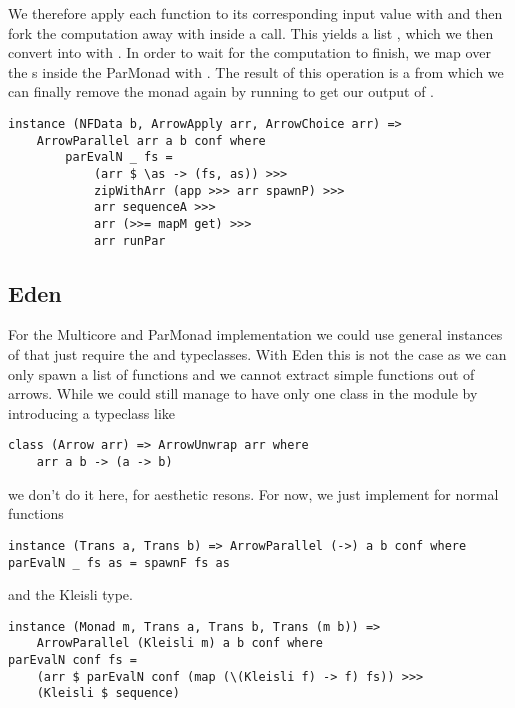 We therefore apply each function to its corresponding input value with  and then fork the computation away with  inside a  call. This yields a list , which we then convert into  with . In order to wait for the computation to finish, we map over the s inside the ParMonad with . The result of this operation is a  from which we can finally remove the monad again by running  to get our output of \code{[b]}.
\begin{lstlisting}[frame=htrbl]
instance (NFData b, ArrowApply arr, ArrowChoice arr) =>
	ArrowParallel arr a b conf where
		parEvalN _ fs = 
			(arr $ \as -> (fs, as)) >>>
			zipWithArr (app >>> arr spawnP) >>>
			arr sequenceA >>>
			arr (>>= mapM get) >>>
			arr runPar
\end{lstlisting} %

\subsection{Eden}
For the Multicore and ParMonad implementation we could use general instances of  that just require the  and  typeclasses. With Eden this is not the case as we can only spawn a list of functions and we cannot extract simple functions out of arrows. While we could still manage to have only one class in the module by introducing a typeclass like
\begin{lstlisting}[frame=htrbl]
class (Arrow arr) => ArrowUnwrap arr where
	arr a b -> (a -> b)
\end{lstlisting} %
we don't do it here, for aesthetic resons. For now, we just implement  for normal functions
\begin{lstlisting}[frame=htrbl]
instance (Trans a, Trans b) => ArrowParallel (->) a b conf where
parEvalN _ fs as = spawnF fs as
\end{lstlisting}
and the Kleisli type.
\begin{lstlisting}[frame=htrbl]
instance (Monad m, Trans a, Trans b, Trans (m b)) =>
	ArrowParallel (Kleisli m) a b conf where
parEvalN conf fs =
	(arr $ parEvalN conf (map (\(Kleisli f) -> f) fs)) >>>
	(Kleisli $ sequence)
\end{lstlisting}

